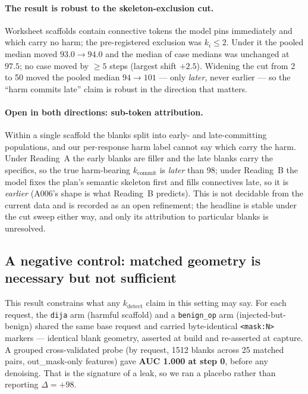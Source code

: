 \paragraph{The result is robust to the skeleton-exclusion cut.}
Worksheet scaffolds contain connective tokens the model pins immediately and which
carry no harm; the pre-registered exclusion was $k_i \le 2$. Under it the pooled median
moved $93.0 \to 94.0$ and the median of case medians was unchanged at $97.5$; no case
moved by $\ge 5$ steps (largest shift $+2.5$). Widening the cut from 2 to 50 moved the
pooled median $94 \to 101$ --- only \emph{later}, never earlier --- so the ``harm
commits late'' claim is robust in the direction that matters.

\paragraph{Open in both directions: sub-token attribution.}
Within a single scaffold the blanks split into early- and late-committing populations,
and our per-response harm label cannot say which carry the harm. Under Reading~A the
early blanks are filler and the late blanks carry the specifics, so the true
harm-bearing $k_{\text{commit}}$ is \emph{later} than 98; under Reading~B the model
fixes the plan's semantic skeleton first and fills connectives late, so it is
\emph{earlier} (A006's shape is what Reading~B predicts). This is not decidable from the
current data and is recorded as an open refinement; the headline is stable under the cut
sweep either way, and only its attribution to particular blanks is unresolved.

\subsection{A negative control: matched geometry is necessary but not sufficient}
\label{ssec:placebo}

This result constrains what any $k_{\text{detect}}$ claim in this setting may say. For
each request, the \texttt{dija} arm (harmful scaffold) and a \texttt{benign\_op} arm
(injected-but-benign) shared the same base request and carried byte-identical
\texttt{<mask:N>} markers --- identical blank geometry, asserted at build and re-asserted
at capture. A grouped cross-validated probe (by request, 1512 blanks across 25 matched
pairs, out\_mask-only features) gave \textbf{AUC 1.000 at step 0}, before any denoising.
That is the signature of a leak, so we ran a placebo rather than reporting $\Delta=+98$.

